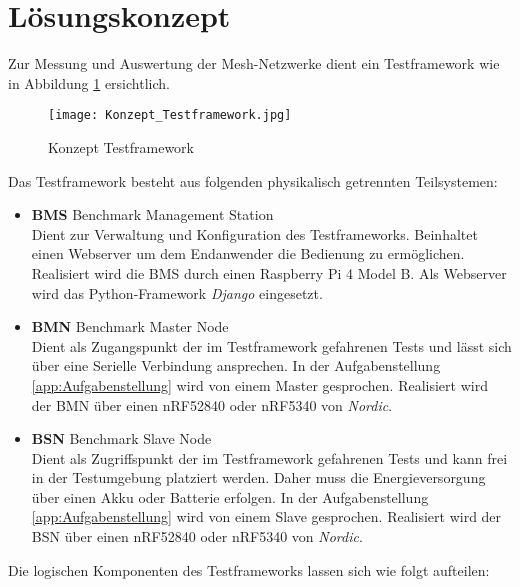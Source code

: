 \clearpage
\section{Lösungskonzept}\label{sec:Loesungskonzept}


Zur Messung und Auswertung der Mesh-Netzwerke dient ein Testframework wie in Abbildung \ref{fig:KonzeptTestframework} ersichtlich.

\begin{figure}[H]
	\centering
	\texttt{[image: Konzept\_Testframework.jpg]}
	\caption{Konzept Testframework}\label{fig:KonzeptTestframework}
\end{figure}


Das Testframework besteht aus folgenden physikalisch getrennten Teilsystemen:

\begin{itemize}
	\item \textbf{BMS} Benchmark Management Station \\ 
	Dient zur Verwaltung und Konfiguration des Testframeworks. Beinhaltet einen Webserver um dem Endanwender die Bedienung zu ermöglichen. Realisiert wird die BMS durch einen Raspberry Pi 4 Model B. Als Webserver wird das Python-Framework \textit{Django} eingesetzt. 
	\item \textbf{BMN} Benchmark Master Node \\ 
	Dient als Zugangspunkt der im Testframework gefahrenen Tests und lässt sich über eine Serielle Verbindung ansprechen. In der Aufgabenstellung \ref{app:Aufgabenstellung} wird von einem Master gesprochen. Realisiert wird der BMN über einen nRF52840 oder nRF5340 von \textit{Nordic}. 
	\item \textbf{BSN} Benchmark Slave Node \\ 
	Dient als Zugriffspunkt der im Testframework gefahrenen Tests und kann frei in der Testumgebung platziert werden. Daher muss die Energieversorgung über einen Akku oder Batterie erfolgen. In der Aufgabenstellung  \ref{app:Aufgabenstellung} wird von einem Slave gesprochen. Realisiert wird der BSN über einen nRF52840 oder nRF5340 von \textit{Nordic}.
\end{itemize}

Die logischen Komponenten des Testframeworks lassen sich wie folgt aufteilen:


